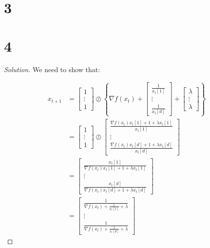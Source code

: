 \documentclass{article}
\newenvironment{solution}
  {\renewcommand\qedsymbol{$\blacksquare$}\begin{proof}[Solution]}
  {\end{proof}}
\begin{document}
\section*{3}

\section*{4}

\begin{solution}

    We need to show that:

    \begin{align*}
        x_{t + 1}
        &=
        \begin{bmatrix}
            1 \\
            \vdots \\
            1
        \end{bmatrix} 
        \oslash 
        \left\{
        \nabla f(x_t) + 
        \begin{bmatrix}
            \frac{1}{x_t[1]} \\
            \vdots \\
            \frac{1}{x_t[d]}
        \end{bmatrix} 
        + 
        \begin{bmatrix}
            \lambda \\
            \vdots \\
            \lambda
        \end{bmatrix} 
        \right\} \\
        &=
        \begin{bmatrix}
            1 \\
            \vdots \\
            1
        \end{bmatrix} 
        \oslash 
        \begin{bmatrix}
            \frac{\nabla f(x_t)x_t[1] + 1 + \lambda x_t[1]}{x_t[1]} \\
            \vdots \\
            \frac{\nabla f(x_t)x_t[d] + 1 + \lambda x_t[d]}{x_t[d]}
        \end{bmatrix} \\
        &=
        \begin{bmatrix}
            \frac{x_t[1]}{\nabla f(x_t)x_t[1] + 1 + \lambda x_t[1]} \\
            \vdots \\
            \frac{x_t[d]}{\nabla f(x_t)x_t[d] + 1 + \lambda x_t[d]}
        \end{bmatrix} \\
        &= 
        \begin{bmatrix}
            \frac{1}{\nabla f(x_t) + \frac{1}{x_t[1]} + \lambda} \\
            \vdots \\
            \frac{1}{\nabla f(x_t) + \frac{1}{x_t[d]} + \lambda}
        \end{bmatrix} \tag{*}
    \end{align*}


\end{solution}
\end{document}
